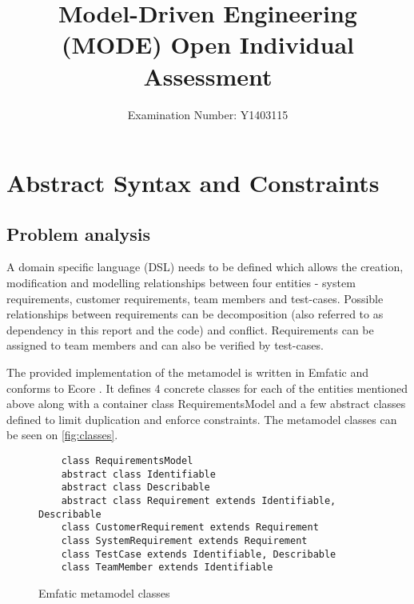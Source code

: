 \documentclass[11pt,a4paper]{article}
\title{Model-Driven Engineering (MODE) Open Individual Assessment}
\author{Examination Number: Y1403115}
\date{}
\begin{document}
	
\maketitle

\section{Abstract Syntax and Constraints}

	\subsection{Problem analysis}
	A domain specific language (DSL) needs to be defined which allows the creation, modification and modelling relationships between four entities - system requirements, customer requirements, team members and test-cases. Possible relationships between requirements can be decomposition (also referred to as dependency in this report and the code) and conflict. Requirements can be assigned to team members and can also be verified by test-cases. 
	
	The provided implementation of the metamodel is written in Emfatic \cite{emfatic} and conforms to Ecore \cite{ecore}. It defines 4 concrete classes for each of the entities mentioned above along with a container class RequirementsModel and a few abstract classes defined to limit duplication and enforce constraints. The metamodel classes can be seen on \autoref{fig:classes}.
	
	\begin{figure}[h!]
	\begin{framed}
	
		\begin{lstlisting}
	class RequirementsModel
	abstract class Identifiable
	abstract class Describable
	abstract class Requirement extends Identifiable, Describable
	class CustomerRequirement extends Requirement
	class SystemRequirement extends Requirement
	class TestCase extends Identifiable, Describable
	class TeamMember extends Identifiable
		\end{lstlisting}
		
	\caption{Emfatic metamodel classes}
	\label{fig:classes}
	\end{framed}
	\end{figure}
	
\end{document}
